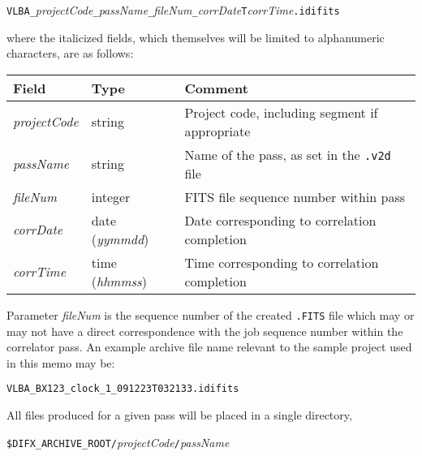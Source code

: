 \vspace{5pt}

{\tt VLBA\_}{\em projectCode}{\tt \_}{\em passName}{\tt \_}{\em fileNum}{\tt \_}{\em corrDate}{\tt T}{\em corrTime}{\tt .idifits}

\vspace{5pt}

\noindent
where the italicized fields, which themselves will be limited to alphanumeric characters, are as follows:

\begin{center}
\begin{tabular}{lll}
\hline
\hline
Field & Type & Comment \\
\hline
{\em projectCode}	& string		& Project code, including segment if appropriate \\
{\em passName}		& string		& Name of the pass, as set in the {\tt .v2d} file \\
{\em fileNum}		& integer		& FITS file sequence number within pass \\
{\em corrDate}		& date ({\em yymmdd})	& Date corresponding to correlation completion \\
{\em corrTime}		& time ({\em hhmmss})	& Time corresponding to correlation completion \\
\hline
\end{tabular}
\end{center}

\noindent
Parameter {\em fileNum} is the sequence number of the created {\tt .FITS} file which may or may not have a direct correspondence with the job sequence number within the correlator pass.
An example archive file name relevant to the sample project used in this memo may be:

\vspace{5pt}

{\tt VLBA\_BX123\_clock\_1\_091223T032133.idifits}

\vspace{5pt}

\noindent
All files produced for a given pass will be placed in a single directory, 

\vspace{5pt}

{\tt \$DIFX\_ARCHIVE\_ROOT/}{\em projectCode}{\tt /}{\em passName}

\vspace{5pt}

